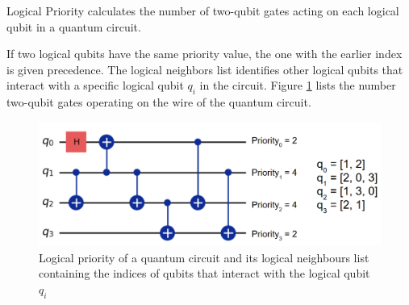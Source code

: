 \begin{definition} %
    Logical Priority calculates the number of two-qubit gates acting on each logical qubit in a quantum circuit.
\end{definition}
If two logical qubits have the same priority value, the one with the earlier index is given precedence. The logical neighbors list identifies other logical qubits that interact with a specific logical qubit $q_i$ in the circuit. Figure \ref{fig:logical-priority} lists the number two-qubit gates operating on the wire of the quantum circuit.
\begin{figure}[h]
    \centering
    \includegraphics[width=0.7\linewidth]{image/logical_priority.png}
    \caption{Logical priority of a quantum circuit and its logical neighbours list containing the indices of qubits that interact with the logical qubit $q_i$}
    \label{fig:logical-priority}
\end{figure}

